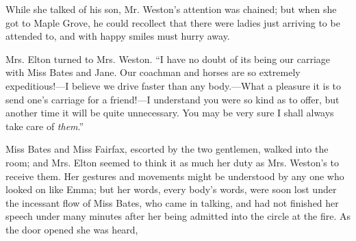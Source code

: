 While she talked of his son, Mr. Weston's attention was chained; but when she got to Maple Grove, he could recollect that there were ladies just arriving to be attended to, and with happy smiles must hurry away.

Mrs. Elton turned to Mrs. Weston. “I have no doubt of its being our carriage with Miss Bates and Jane. Our coachman and horses are so extremely expeditious!---I believe we drive faster than any body.---What a pleasure it is to send one's carriage for a friend!---I understand you were so kind as to offer, but another time it will be quite unnecessary. You may be very sure I shall always take care of {\em them}.”

Miss Bates and Miss Fairfax, escorted by the two gentlemen, walked into the room; and Mrs. Elton seemed to think it as much her duty as Mrs. Weston's to receive them. Her gestures and movements might be understood by any one who looked on like Emma; but her words, every body's words, were soon lost under the incessant flow of Miss Bates, who came in talking, and had not finished her speech under many minutes after her being admitted into the circle at the fire. As the door opened she was heard,

